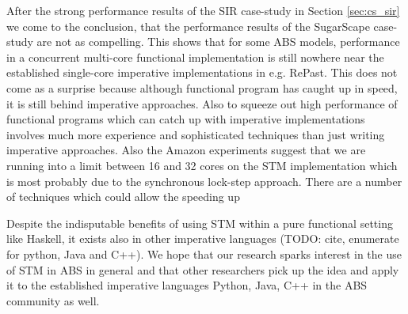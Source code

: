 After the strong performance results of the SIR case-study in Section \ref{sec:cs_sir} we come to the conclusion, that the performance results of the SugarScape case-study are not as compelling. This shows that for some ABS models, performance in a concurrent multi-core functional implementation is still nowhere near the established single-core imperative implementations in e.g. RePast. This does not come as a surprise because although functional program has caught up in speed, it is still behind imperative approaches. Also to squeeze out high performance of functional programs which can catch up with imperative implementations involves much more experience and sophisticated techniques than just writing imperative approaches.
Also the Amazon experiments suggest that we are running into a limit between 16 and 32 cores on the STM implementation which is most probably due to the synchronous lock-step approach. There are a number of techniques which could allow the speeding up 

Despite the indisputable benefits of using STM within a pure functional setting like Haskell, it exists also in other imperative languages (TODO: cite, enumerate for python, Java and C++). We hope that our research sparks interest in the use of STM in ABS in general and that other researchers pick up the idea and apply it to the established imperative languages Python, Java, C++ in the ABS community as well.